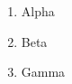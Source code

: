 \documentclass{article}
\begin{document}
\begin{enumerate}
\item Alpha
\item Beta
\item Gamma
\end{enumerate}
\end{document}
